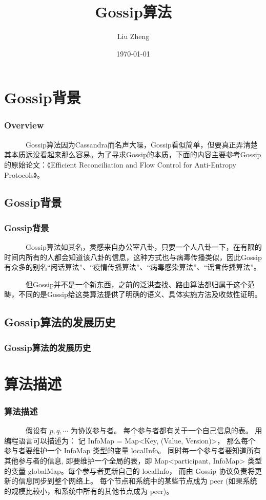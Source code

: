 \documentclass[slidestop,compress,mathserif,c]{beamer}
\title{Gossip算法}
\author{Liu Zheng}
\date{\today}
\institute{同济大学电信学院}
\begin{document}
\frame{\titlepage}

\section{Gossip背景}

\begin{frame}
\frametitle{Overview}
~~~~~~Gossip算法因为Cassandra而名声大噪，Gossip看似简单，但要真正弄清楚其本质远没看起来那么容易。为了寻求Gossip的本质，下面的内容主要参考Gossip的原始论文：《Efficient Reconciliation and Flow Control for Anti-Entropy Protocols》。
\end{frame}

\subsection{\hfill  Gossip背景}
\begin{frame}
\frametitle{Gossip背景}
~~~~~~Gossip算法如其名，灵感来自办公室八卦，只要一个人八卦一下，在有限的时间内所有的人都会知道该八卦的信息，这种方式也与病毒传播类似，因此Gossip有众多的别名“闲话算法”、“疫情传播算法”、“病毒感染算法”、“谣言传播算法”。

~~~~~~但Gossip并不是一个新东西，之前的泛洪查找、路由算法都归属于这个范畴，不同的是Gossip给这类算法提供了明确的语义、具体实施方法及收敛性证明。
\end{frame}


\subsection{\hfill Gossip算法的发展历史}
\begin{frame}
\frametitle{Gossip算法的发展历史}
 
\end{frame}


\section{算法描述}

\begin{frame}
\frametitle{算法描述}
~~~~~~假设有 ${p, q, \cdots}$ 为协议参与者。 每个参与者都有关于一个自己信息的表。
用编程语言可以描述为： 
记 InfoMap = Map<Key, (Value, Version)>， 那么每个参与者要维护一个 InfoMap 类型的变量 localInfo。 同时每一个参与者要知道所有其他参与者的信息, 即要维护一个全局的表，即 Map<participant, InfoMap> 类型的变量 globalMap。每个参与者更新自己的 localInfo， 而由 Gossip 协议负责将更新的信息同步到整个网络上。
每个节点和系统中的某些节点成为 peer (如果系统的规模比较小，和系统中所有的其他节点成为 peer)。 
\end{frame}
\end{document}
